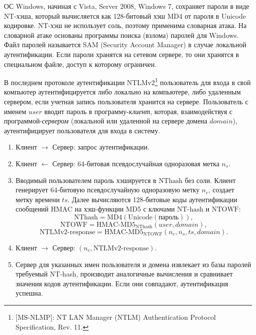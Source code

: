 \documentclass[10pt,a4paper]{book}
\newcommand{\HMAC}{\textrm{HMAC}}
\begin{document}

ОС Windows, начиная с Vista, Server 2008, Windows 7, сохраняет пароли  в виде NT-хэша, который вычисляется как 128-битовый хэш MD4 от пароля в Unicode кодировке. NT-хэш не использует соль, поэтому применима словарная атака. На словарной атаке основаны программы поиска (взлома) паролей для Windows. Файл паролей называется SAM (Security Account Manager) в случае локальной аутентификации. Если пароли хранятся на сетевом сервере, то они хранятся в специальном файле, доступ к которому ограничен.

В последнем протоколе аутентификации NTLMv2\footnote{[MS-NLMP]: NT LAN Manager (NTLM) Authentication Protocol Specification, Rev. 11.} пользователь для входа в свой компьютер аутентифицируется либо локально на компьютере, либо удаленным сервером, если учетная запись пользователя хранится на сервере. Пользователь с именем $user$ вводит пароль в программу-\emph{клиент}, которая, взаимодействуя с программой-\emph{сервером} (локальной или удаленной на сервере домена $domain$), аутентифицирует пользователя для входа в систему.
\begin{enumerate}
    \item Клиент $\rightarrow$ Сервер: запрос аутентификации.
    \item Клиент $\leftarrow$ Сервер: 64-битовая псевдослучайная одноразовая метка $n_s$.
    \item Вводимый пользователем пароль хэшируется в $\textrm{NThash}$ без соли. Клиент генерирует 64-битовую псевдослучайную одноразовую метку $n_c$, создает метку времени $ts$. Далее вычисляются 128-битовые коды аутентификации сообщений $\HMAC$ на хэш-функции MD5 с ключами $\textrm{NT-hash}$ и $\textrm{NTOWF}$:
        \[ \textrm{NThash} = \text{MD4}(\text{Unicode}(\text{пароль})), \]
        \[ \textrm{NTOWF} = \textrm{HMAC-MD5}_{\textrm{NThash}}(user, domain), \]
        \[ \textrm{NTLMv2-response} = \textrm{HMAC-MD5}_{\textrm{NTOWF}}(n_c, n_s, ts, domain). \]
    \item Клиент $\rightarrow$ Сервер: $(n_c, \textrm{NTLMv2-response})$. %
    \item Сервер для указанных имен пользователя и домена извлекает из базы паролей требуемый NT-hash, производит аналогичные вычисления и сравнивает значения кодов аутентификации. Если они совпадают, аутентификация успешна.
\end{enumerate}
\end{document}
